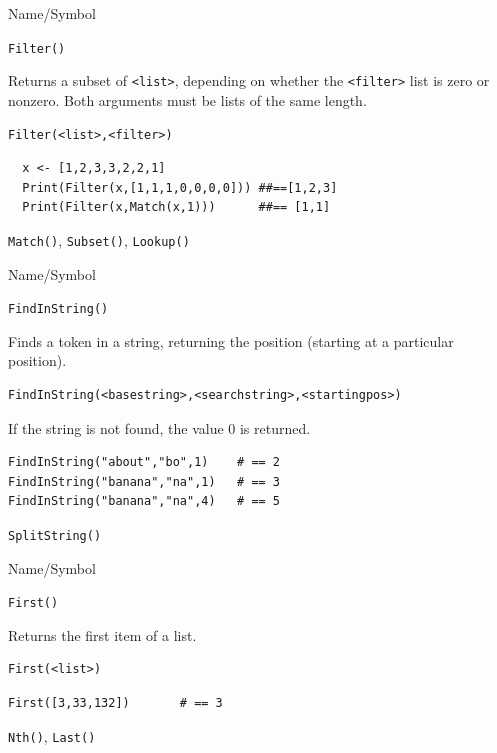 \begin{desc}{Name/Symbol}
\item[Name/Symbol]	\verb+Filter()+            

\item[Description] Returns a subset of \verb+<list>+, depending on whether the \verb+<filter>+ list is zero or nonzero.  Both arguments must be lists of the same length.

\item[Usage]		
\begin{verbatim}
Filter(<list>,<filter>)
\end{verbatim}

\item[Example]	
\begin{verbatim} 
  x <- [1,2,3,3,2,2,1]
  Print(Filter(x,[1,1,1,0,0,0,0])) ##==[1,2,3]
  Print(Filter(x,Match(x,1)))      ##== [1,1]
\end{verbatim}

\item[See Also]	\verb+Match()+, \verb+Subset()+, \verb+Lookup()+
\end{desc}


\begin{desc}{Name/Symbol}
\item[Name/Symbol]	\verb+FindInString()+

\item[Description]	Finds a token in a string, returning the position (starting at a particular position).

\item[Usage]
\begin{verbatim}
FindInString(<basestring>,<searchstring>,<startingpos>)
\end{verbatim}

If the string is not found, the value 0 is returned.
\item[Example]
\begin{verbatim}
FindInString("about","bo",1) 	# == 2
FindInString("banana","na",1) 	# == 3
FindInString("banana","na",4) 	# == 5
\end{verbatim}

\item[See Also]	\verb+SplitString()+
\end{desc}



\begin{desc}{Name/Symbol}
\item[Name/Symbol]	\verb+First()+

\item[Description]	Returns the first item of a list.

\item[Usage]
\begin{verbatim}
First(<list>)
\end{verbatim}

\item[Example]
\begin{verbatim}
First([3,33,132])		# == 3
\end{verbatim}

\item[See Also]	\verb+Nth()+, \verb+Last()+
\end{desc}


